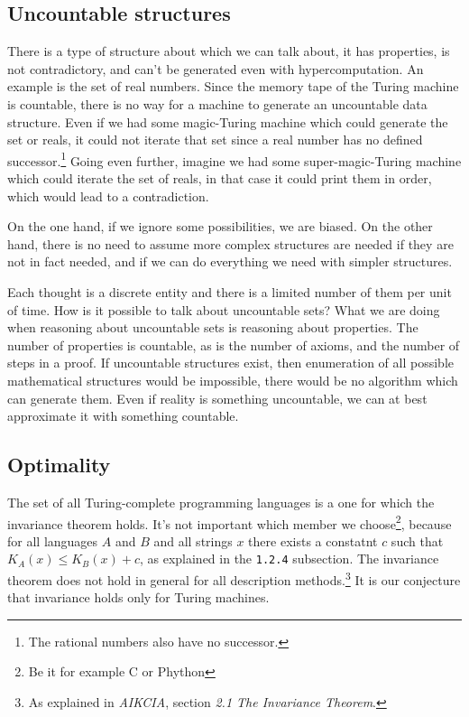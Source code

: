 \newpage

\subsection{Uncountable structures}

There is a type of structure about which we can talk about, it has properties, is not contradictory, and can't be generated even with hypercomputation.
An example is the set of real numbers. 
Since the memory tape of the Turing machine is countable, there is no way for a machine to generate an uncountable data structure.
Even if we had some magic-Turing machine which could generate the set or reals, it could not iterate that set since a real number has no defined successor.\footnote{The rational numbers also have no successor.}
Going even further, imagine we had some super-magic-Turing machine which could iterate the set of reals, in that case it could print them in order, which would lead to a contradiction.

On the one hand, if we ignore some possibilities, we are biased.
On the other hand, there is no need to assume more complex structures are needed if they are not in fact needed, and if we can do everything we need with simpler structures.

Each thought is a discrete entity and there is a limited number of them per unit of time.
How is it possible to talk about uncountable sets?
What we are doing when reasoning about uncountable sets is reasoning about properties.
The number of properties is countable, as is the number of axioms, and the number of steps in a proof.
If uncountable structures exist, then enumeration of all possible mathematical structures would be impossible, there would be no algorithm which can generate them.
Even if reality is something uncountable, we can at best approximate it with something countable.

\newpage

\subsection{Optimality}

The set of all Turing-complete programming languages is a one for which the invariance theorem holds.
It's not important which member we choose\footnote{Be it for example C or Phython}, because for all languages $A$ and $B$ and all strings $x$ there exists a constatnt $c$ such that $K_A(x) \leq K_B(x) + c$, as explained in the \texttt{1.2.4} subsection.
The invariance theorem does not hold in general for all description methods.\footnote{As explained in \textit{AIKCIA}, section \textit{2.1 The Invariance Theorem}.}
It is our conjecture that invariance holds only for Turing machines.

